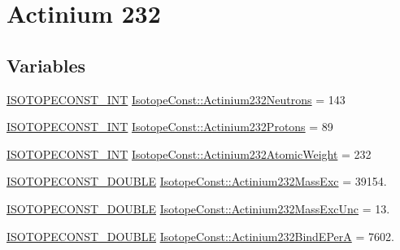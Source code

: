 \hypertarget{group___isotope_const-_actinium-_ac232}{}\section{Actinium 232}
\label{group___isotope_const-_actinium-_ac232}
\subsection*{Variables}
\begin{DoxyCompactItemize}
\item 
\mbox{\hyperlink{group___isotope_const-_macros_ga5f18360b3e99483a35c32d789e62621c}{I\+S\+O\+T\+O\+P\+E\+C\+O\+N\+S\+T\+\_\+\+I\+NT}} \mbox{\hyperlink{group___isotope_const-_actinium-_ac232_gae58caf93b00d4e3949612f922e60f106}{Isotope\+Const\+::\+Actinium232\+Neutrons}} = 143
\item 
\mbox{\hyperlink{group___isotope_const-_macros_ga5f18360b3e99483a35c32d789e62621c}{I\+S\+O\+T\+O\+P\+E\+C\+O\+N\+S\+T\+\_\+\+I\+NT}} \mbox{\hyperlink{group___isotope_const-_actinium-_ac232_ga6231110d161e04ac2d35f79aef44f4ff}{Isotope\+Const\+::\+Actinium232\+Protons}} = 89
\item 
\mbox{\hyperlink{group___isotope_const-_macros_ga5f18360b3e99483a35c32d789e62621c}{I\+S\+O\+T\+O\+P\+E\+C\+O\+N\+S\+T\+\_\+\+I\+NT}} \mbox{\hyperlink{group___isotope_const-_actinium-_ac232_ga5e67d5f74e77399ea3fb6b6c6ec71422}{Isotope\+Const\+::\+Actinium232\+Atomic\+Weight}} = 232
\item 
\mbox{\hyperlink{group___isotope_const-_macros_ga8f45a7272ce02c0b4c65c44636ed719a}{I\+S\+O\+T\+O\+P\+E\+C\+O\+N\+S\+T\+\_\+\+D\+O\+U\+B\+LE}} \mbox{\hyperlink{group___isotope_const-_actinium-_ac232_gadf11cafde8e9ca8ed05c50fc2c2a0064}{Isotope\+Const\+::\+Actinium232\+Mass\+Exc}} = 39154.
\item 
\mbox{\hyperlink{group___isotope_const-_macros_ga8f45a7272ce02c0b4c65c44636ed719a}{I\+S\+O\+T\+O\+P\+E\+C\+O\+N\+S\+T\+\_\+\+D\+O\+U\+B\+LE}} \mbox{\hyperlink{group___isotope_const-_actinium-_ac232_ga0e82d9c42863ff520c71d25b23daa0bd}{Isotope\+Const\+::\+Actinium232\+Mass\+Exc\+Unc}} = 13.
\item 
\mbox{\hyperlink{group___isotope_const-_macros_ga8f45a7272ce02c0b4c65c44636ed719a}{I\+S\+O\+T\+O\+P\+E\+C\+O\+N\+S\+T\+\_\+\+D\+O\+U\+B\+LE}} \mbox{\hyperlink{group___isotope_const-_actinium-_ac232_ga35cd67c3f390d7c91aa67f56e5e66d79}{Isotope\+Const\+::\+Actinium232\+Bind\+E\+PerA}} = 7602.
\item 

\end{DoxyCompactItemize}
